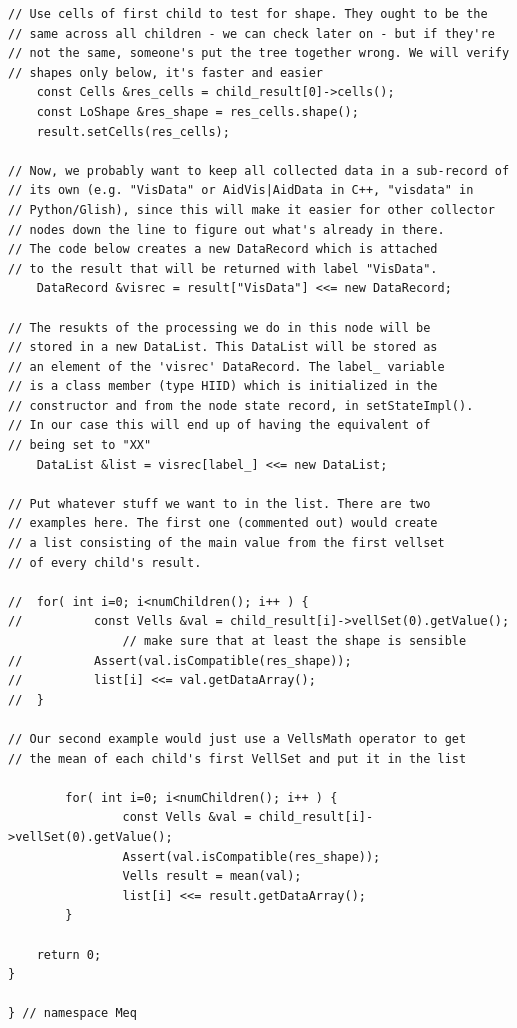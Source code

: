 \documentclass[10pt]{article}
\begin{document}
\begin{verbatim}
// Use cells of first child to test for shape. They ought to be the 
// same across all children - we can check later on - but if they're 
// not the same, someone's put the tree together wrong. We will verify
// shapes only below, it's faster and easier
	const Cells &res_cells = child_result[0]->cells();
	const LoShape &res_shape = res_cells.shape();
	result.setCells(res_cells);

// Now, we probably want to keep all collected data in a sub-record of 
// its own (e.g. "VisData" or AidVis|AidData in C++, "visdata" in 
// Python/Glish), since this will make it easier for other collector 
// nodes down the line to figure out what's already in there.
// The code below creates a new DataRecord which is attached
// to the result that will be returned with label "VisData".
	DataRecord &visrec = result["VisData"] <<= new DataRecord;

// The resukts of the processing we do in this node will be
// stored in a new DataList. This DataList will be stored as
// an element of the 'visrec' DataRecord. The label_ variable
// is a class member (type HIID) which is initialized in the 
// constructor and from the node state record, in setStateImpl().
// In our case this will end up of having the equivalent of
// being set to "XX" 
	DataList &list = visrec[label_] <<= new DataList;

// Put whatever stuff we want to in the list. There are two
// examples here. The first one (commented out) would create
// a list consisting of the main value from the first vellset 
// of every child's result.

//	for( int i=0; i<numChildren(); i++ ) {
//    		const Vells &val = child_result[i]->vellSet(0).getValue();
                // make sure that at least the shape is sensible
//    		Assert(val.isCompatible(res_shape));
//    		list[i] <<= val.getDataArray();
//	}

// Our second example would just use a VellsMath operator to get
// the mean of each child's first VellSet and put it in the list

        for( int i=0; i<numChildren(); i++ ) {
                const Vells &val = child_result[i]->vellSet(0).getValue();
                Assert(val.isCompatible(res_shape));
                Vells result = mean(val);
                list[i] <<= result.getDataArray();
        }

 	return 0;
}

} // namespace Meq
\end{verbatim}
\end{document}
